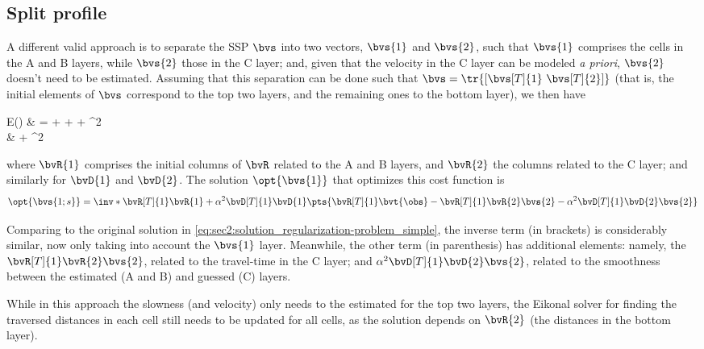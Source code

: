 \subsection{Split profile}
A different valid approach is to separate the SSP $\bvs$ into two vectors, $\bvs{1}$ and $\bvs{2}$, such that $\bvs{1}$ comprises the cells in the A and B layers, while $\bvs{2}$ those in the C layer; and, given that the velocity in the C layer can be modeled \textit{a priori}, $\bvs{2}$ doesn't need to be estimated. Assuming that this separation can be done such that $\bvs = \tr{[\bvs[T]{1}~ \bvs[T]{2}]}$ (that is, the initial elements of $\bvs$ correspond to the top two layers, and the remaining ones to the bottom layer), we then have
\begin{equations}
	E()
	& =     +   +    + ^2 \\
	& + \alpha^2
\end{equations}
where $\bvR{1}$ comprises the initial columns of $\bvR$ related to the A and B layers, and $\bvR{2}$ the columns related to the C layer; and similarly for $\bvD{1}$ and $\bvD{2}$. The solution $\opt{\bvs{1}}$ that optimizes this cost function is
\begin{equation}
	\opt{\bvs{1;s}} = \inv*{\bvR[T]{1} \bvR{1} + \alpha^2 \bvD[T]{1} \bvD{1}} \pts{\bvR[T]{1}\bvt{\obs} - \bvR[T]{1}\bvR{2}\bvs{2} - \alpha^2 \bvD[T]{1} \bvD{2} \bvs{2}}
\end{equation}

Comparing to the original solution in \cref{eq:sec2:solution_regularization-problem_simple}, the inverse term (in brackets) is considerably similar, now only taking into account the $\bvs{1}$ layer. Meanwhile, the other term (in parenthesis) has additional elements: namely, the $\bvR[T]{1}\bvR{2}\bvs{2}$, related to the travel-time in the C layer; and $\alpha^2 \bvD[T]{1} \bvD{2} \bvs{2}$, related to the smoothness between the estimated (A and B) and guessed (C) layers.

While in this approach the slowness (and velocity) only needs to the estimated for the top two layers, the Eikonal solver for finding the traversed distances in each cell still needs to be updated for all cells, as the solution depends on $\bvR{2}$ (the distances in the bottom layer).


